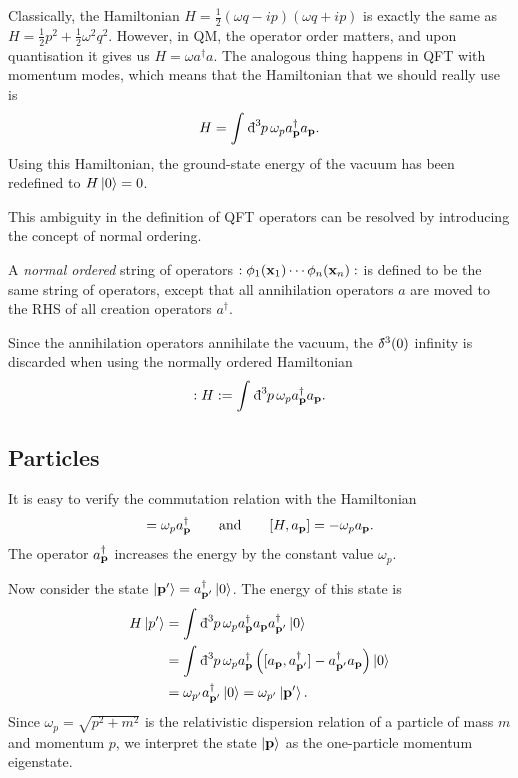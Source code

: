 Classically, the Hamiltonian $H = \frac{1}{2}(\omega q - i p)(\omega q + ip)$ is exactly the same as $H = \frac{1}{2}p^2 + \frac{1}{2} \omega^2 q^2$.
However, in QM, the operator order matters, and upon quantisation it gives us $H = \omega a^{\dagger} a$.
The analogous thing happens in QFT with momentum modes, which means that the Hamiltonian that we should really use is
\begin{equation}
  H = \int_{}^{} \bdd[3]{p} \omega_p a^{\dagger}_{\vb{p}} a_{\vb{p}}.
\end{equation}
Using this Hamiltonian, the ground-state energy of the vacuum has been redefined to $H \ket{0} = 0$.

This ambiguity in the definition of QFT operators can be resolved by introducing the concept of normal ordering.
\begin{definition}
  A \emph{normal ordered} string of operators $: \phi_1(\vb{x}_1) \cdots \phi_n(\vb{x}_n) :$ is defined to be the same string of operators, except that all annihilation operators $a$ are moved to the RHS of all creation operators $a^{\dagger}$.
\end{definition}
Since the annihilation operators annihilate the vacuum, the $\bdelta^3(0)$ infinity is discarded when using the normally ordered Hamiltonian
\begin{equation}
  :H: = \int_{}^{} \bdd[3]{p} \omega_p a^{\dagger}_{\vb{p}} a_{\vb{p}}.
\end{equation}

\subsection{Particles}%
\label{sub:particles}

It is easy to verify the commutation relation with the Hamiltonian
\begin{equation}
  [H, a_{\vb{p}}^{\dagger}] = \omega_p a_{\vb{p}}^{\dagger} \qquad \text{and} \qquad 
  [H, a_{\vb{p}}] = -\omega_p a_{\vb{p}}.
\end{equation}
The operator $a_{\vb{p}}^{\dagger}$ increases the energy by the constant value $\omega_p$.

Now consider the state $\ket{\vb{p}'} = a_{\vb{p}'}^{\dagger} \ket{0}$. The energy of this state is
\begin{align}
  H \ket{p'} &= \int_{}^{} \bdd[3]{p} \omega_p a_{\vb{p}}^{\dagger} a_{\vb{p}} a_{\vb{p}'}^{\dagger} \ket{0}\\
  &= \int_{}^{} \bdd[3]{p} \omega_p a_{\vb{p}}^{\dagger} \left( [a_{\vb{p}}, a_{\vb{p}'}^{\dagger}] - a_{\vb{p}'}^{\dagger} a_{\vb{p}} \right) \ket{0} \\
  &= \omega_{p'} a_{\vb{p}'}^{\dagger} \ket{0} = \omega_{p'} \ket{\vb{p}'}.
\end{align}
Since $\omega_p = \sqrt{p^2 + m^2}$ is the relativistic dispersion relation of a particle of mass $m$ and momentum $p$, we interpret the state  $\ket{\vb{p}}$ as the one-particle momentum eigenstate.

